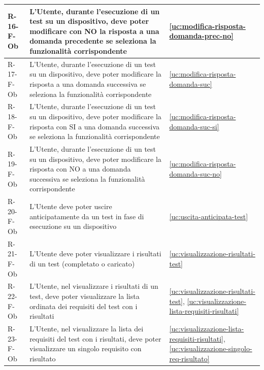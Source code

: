 ﻿\documentclass[a4paper,12pt]{article}
\begin{document}
{{\begin{longtable}{|l|p{}|p{}|}
            R-16-F-Ob       & L'Utente, durante l'esecuzione di un test su un dispositivo, deve poter modificare con NO la risposta a una domanda precedente se seleziona la funzionalità corrispondente                         & \ref{uc:modifica-risposta-domanda-prec-no}                                                 \\ \hline
            R-17-F-Ob       & L'Utente, durante l'esecuzione di un test su un dispositivo, deve poter modificare la risposta a una domanda successiva se seleziona la funzionalità corrispondente                         & \ref{uc:modifica-risposta-domanda-suc}                                                 \\ \hline
            R-18-F-Ob       & L'Utente, durante l'esecuzione di un test su un dispositivo, deve poter modificare la risposta con SI a una domanda successiva se seleziona la funzionalità corrispondente                         & \ref{uc:modifica-risposta-domanda-suc-si}                                                 \\ \hline
            R-19-F-Ob       & L'Utente, durante l'esecuzione di un test su un dispositivo, deve poter modificare la risposta con NO a una domanda successiva se seleziona la funzionalità corrispondente                         & \ref{uc:modifica-risposta-domanda-suc-no}                                                 \\ \hline
            R-20-F-Ob       & L'Utente deve poter uscire anticipatamente da un test in fase di esecuzione su un dispositivo                                                                                               & \ref{uc:uscita-anticipata-test}                                                 \\ \hline
            R-21-F-Ob       & L'Utente deve poter visualizzare i risultati di un test (completato o caricato)                                                                                                             & \ref{uc:visualizzazione-risultati-test}                                               \\ \hline
            R-22-F-Ob       & L'Utente, nel visualizzare i risultati di un test, deve poter visualizzare la lista ordinata dei requisiti del test con i risultati                                                         & \ref{uc:visualizzazione-risultati-test}, \ref{uc:visualizzazione-lista-requisiti-risultati}                 \\ \hline
            R-23-F-Ob       & L'Utente, nel visualizzare la lista dei requisiti del test con i risultati, deve poter visualizzare un singolo requisito con risultato                                                      & \ref{uc:visualizzazione-lista-requisiti-risultati}, \ref{uc:visualizzazione-singolo-req-risultato}         \\ \hline

\end{longtable}}}
\end{document}
